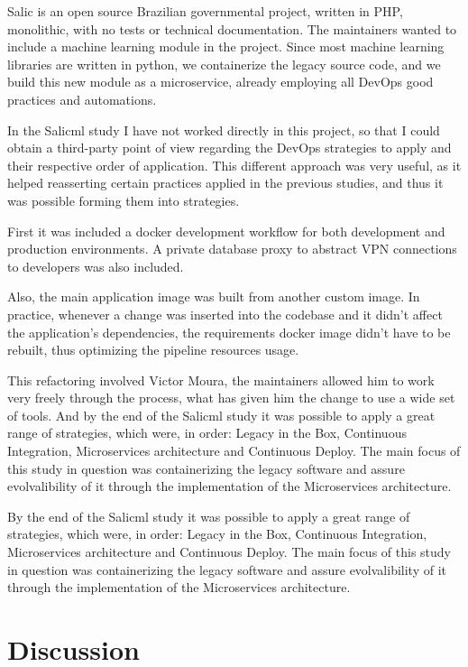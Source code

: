 Salic is an open source Brazilian governmental project, written in  PHP,
monolithic, with no tests or technical documentation. The maintainers wanted to
include a machine learning module in the  project. Since most machine learning
libraries are written in python, we  containerize the legacy source code, and we
build this new module as a microservice, already employing all DevOps good
practices and automations. 

In the Salicml study I have not worked directly in this project, so that I could
obtain a third-party point of view regarding the DevOps strategies to apply and
their respective order of application. This different approach was very useful,
as it helped reasserting certain practices applied in the previous studies, and
thus it was possible forming them into strategies.

First it was included a docker development workflow for both development and
production environments. A private database proxy to abstract VPN connections to
developers was also included.

Also, the main application image was built from another custom image. In
practice, whenever a change was inserted into the codebase and it didn’t affect
the application’s dependencies, the requirements docker image didn’t have to be
rebuilt, thus optimizing the pipeline resources usage.

This refactoring involved Victor Moura, the maintainers allowed him to work very
freely through the process, what has given him the change to use a wide set of
tools. And by the end of the Salicml study it was possible to apply a great
range of strategies, which were, in order: Legacy in the Box, Continuous
Integration, Microservices architecture and Continuous Deploy. The main focus of
this study in question was containerizing the legacy software and assure
evolvalibility of it through the implementation of the Microservices
architecture.

By the end of the Salicml study it was possible to apply a great range of
strategies, which were, in order: Legacy in the Box, Continuous Integration,
Microservices architecture and Continuous Deploy. The main focus of this study
in question was containerizing the legacy software and assure evolvalibility of
it through the implementation of the Microservices architecture.

\section{Discussion}

